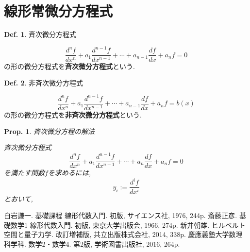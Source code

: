 \documentclass[a4paper,10pt,report]{amsart}
\theoremstyle{plain}
\newtheorem{prop}{Prop.}[section]
\theoremstyle{definition}
\newtheorem{defn}{Def.}[section]
\theoremstyle{remark}
\begin{document}
\section{線形常微分方程式}
\begin{leftbar}
    \begin{defn}斉次微分方程式\par
        \begin{equation}
            \frac{d^{n}f}{dx^{n}}+a_{1}\frac{d^{n-1}f}{dx^{n-1}}+\cdots+a_{n-1}\frac{df}{dx}+a_{n}f=0
        \end{equation}
        の形の微分方程式を\textbf{斉次微分方程式}という. 
    \end{defn}
\end{leftbar}
\begin{leftbar}
    \begin{defn}非斉次微分方程式\par
        \begin{equation}
            \frac{d^{n}f}{dx^{n}}+a_{1}\frac{d^{n-1}f}{dx^{n-1}}+\cdots+a_{n-1}\frac{df}{dx}+a_{n}f=b(x)
        \end{equation}
        の形の微分方程式を\textbf{非斉次微分方程式}という. 
    \end{defn}
\end{leftbar}
\begin{leftbar}
    \begin{prop}斉次微分方程の解法\par
        斉次微分方程式
        \begin{equation*}
            \frac{d^{n}f}{dx^{n}}+a_{1}\frac{d^{n-1}f}{dx^{n-1}}+\cdots+a_{n}\frac{df}{dx}+a_{n}f=0
        \end{equation*}
        を満たす関数\(f\)を求めるには, 
        \begin{equation}
            y_{i}:=\frac{d^{i}f}{dx^{i}}
        \end{equation}
        とおいて,
        
    \end{prop}
\end{leftbar}
\begin{thebibliography}{9}
    白岩謙一. 基礎課程 線形代数入門. 初版, サイエンス社, 1976, 244p.
    斎藤正彦. 基礎数学1 線形代数入門. 初版, 東京大学出版会, 1966, 274p.
    新井朝雄. ヒルベルト空間と量子力学. 改訂増補版, 共立出版株式会社, 2014, 338p.
    慶應義塾大学数理科学科. 数学2・数学4. 第2版, 学術図書出版社, 2016, 264p.
\end{thebibliography}
\end{document}
